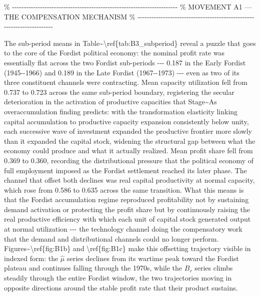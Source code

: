\%
-\/-\/-\/-\/-\/-\/-\/-\/-\/-\/-\/-\/-\/-\/-\/-\/-\/-\/-\/-\/-\/-\/-\/-\/-\/-\/-\/-\/-\/-\/-\/-\/-\/-\/-\/-\/-\/-\/-\/-\/-\/-\/-\/-\/-\/-\/-\/-\/-\/-\/-\/-\/-\/-\/-\/-\/-\/-\/-\/-\/-\/-\/-\/-\/-\/-\/-\/-\/-\/-\/-
\% MOVEMENT A1 --- THE COMPENSATION MECHANISM \%
-\/-\/-\/-\/-\/-\/-\/-\/-\/-\/-\/-\/-\/-\/-\/-\/-\/-\/-\/-\/-\/-\/-\/-\/-\/-\/-\/-\/-\/-\/-\/-\/-\/-\/-\/-\/-\/-\/-\/-\/-\/-\/-\/-\/-\/-\/-\/-\/-\/-\/-\/-\/-\/-\/-\/-\/-\/-\/-\/-\/-\/-\/-\/-\/-\/-\/-\/-\/-\/-\/-

The sub-period means in
Table\textasciitilde\textbackslash ref\{tab:B3\_subperiod\} reveal a
puzzle that goes to the core of the Fordist political economy: the
nominal profit rate was essentially flat across the two Fordist
sub-periods -\/-\/- 0.187 in the Early Fordist (1945-\/-1966) and 0.189
in the Late Fordist (1967-\/-1973) -\/-\/- even as two of its three
constituent channels were contracting. Mean capacity utilization fell
from 0.737 to 0.723 across the same sub-period boundary, registering the
secular deterioration in the activation of productive capacities that
Stage\textasciitilde A\textquotesingle s overaccumulation finding
predicts: with the transformation elasticity linking capital
accumulation to productive capacity expansion consistently below unity,
each successive wave of investment expanded the productive frontier more
slowly than it expanded the capital stock, widening the structural gap
between what the economy could produce and what it actually realized.
Mean profit share fell from 0.369 to 0.360, recording the distributional
pressure that the political economy of full employment imposed as the
Fordist settlement reached its later phase. The channel that offset both
declines was real capital productivity at normal capacity, which rose
from 0.586 to 0.635 across the same transition. What this means is that
the Fordist accumulation regime reproduced profitability not by
sustaining demand activation or protecting the profit share but by
continuously raising the real productive efficiency with which each unit
of capital stock generated output at normal utilization -\/-\/- the
technology channel doing the compensatory work that the demand and
distributional channels could no longer perform.
Figures\textasciitilde\textbackslash ref\{fig:B1b\} and
\textbackslash ref\{fig:B1c\} make this offsetting trajectory visible in
indexed form: the \(\hat{\mu}\) series declines from its wartime peak
toward the Fordist plateau and continues falling through the 1970s,
while the \(B_{r}\) series climbs steadily through the entire Fordist
window, the two trajectories moving in opposite directions around the
stable profit rate that their product sustains.

